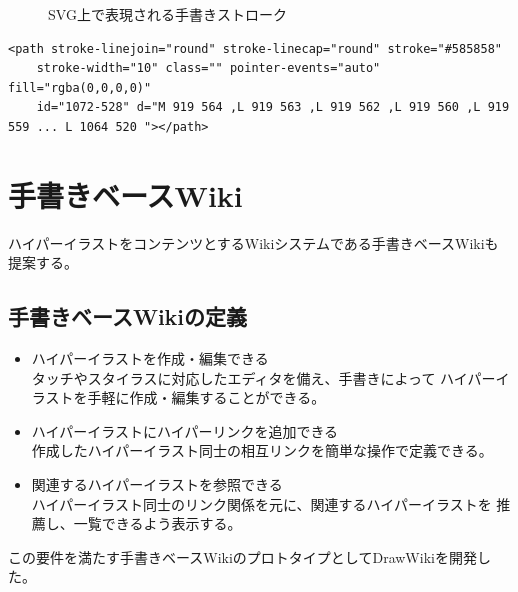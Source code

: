 \begin{figure}[htbp]
    \begin{center}
         \end{center}
    \caption{SVG上で表現される手書きストローク} \label{tegakipath}
\end{figure}

\begin{lstlisting}[caption=図\ref{tegakipath}の実体, label=tegakipathcode]
    <path stroke-linejoin="round" stroke-linecap="round" stroke="#585858"
    stroke-width="10" class="" pointer-events="auto" fill="rgba(0,0,0,0)"
    id="1072-528" d="M 919 564 ,L 919 563 ,L 919 562 ,L 919 560 ,L 919 559 ... L 1064 520 "></path>
\end{lstlisting}


\section{手書きベースWiki}
ハイパーイラストをコンテンツとするWikiシステムである手書きベースWikiも提案する。


\subsection{手書きベースWikiの定義}
\begin{itemize}
    \item ハイパーイラストを作成・編集できる\\
    タッチやスタイラスに対応したエディタを備え、手書きによって
    ハイパーイラストを手軽に作成・編集することができる。
    \item ハイパーイラストにハイパーリンクを追加できる \\
    作成したハイパーイラスト同士の相互リンクを簡単な操作で定義できる。
    \item 関連するハイパーイラストを参照できる \\
    ハイパーイラスト同士のリンク関係を元に、関連するハイパーイラストを
    推薦し、一覧できるよう表示する。
\end{itemize}
この要件を満たす手書きベースWikiのプロトタイプとしてDrawWikiを開発した。

